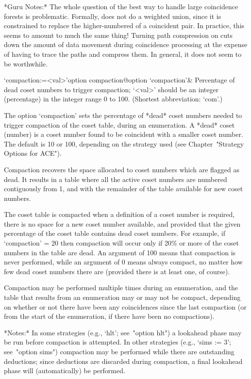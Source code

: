 *Guru Notes:*
The whole question of the best way to handle large coincidence forests
is problematic.  Formally, {\ACE} does  not do a weighted union, since
it is constrained to replace the higher-numbered of a coincident pair.
In practice,  this seems  to amount to  much the same  thing!  Turning
path  compression on  cuts down  the  amount of  data movement  during
coincidence processing at the expense of having to trace the paths and
compress them.  In general, it does not seem to be worthwhile.

\>`compaction:=<val>'{option compaction}@{option `compaction'}&
Percentage of dead coset numbers to trigger compaction; 
`<val>' should be an integer (percentage) in the integer  range  0  to
100. (Shortest abbreviation: `com'.)

The option `compaction' sets the percentage of  *dead*  coset  numbers
needed  to  trigger  compaction  of  the  coset   table,   during   an
enumeration. A *dead* coset (number) is a coset  number  found  to  be
coincident with a smaller coset number. The  default  is  10  or  100,
depending on the strategy  used  (see  Chapter~"Strategy  Options  for
ACE").

Compaction recovers the space allocated to  coset  numbers  which  are
flagged as dead. It results in a table  where  all  the  active  coset
numbers are numbered contiguously from 1, and with  the  remainder  of
the table available for new coset numbers.

The coset table is compacted when a definition of a  coset  number  is
required, there is no space for a  new  coset  number  available,  and
provided that the given percentage of the coset  table  contains  dead
coset numbers. For example, if `compaction'  =  $20$  then  compaction
will occur only if 20\% or more of the coset numbers in the table  are
dead. An argument of 100 means that  compaction  is  never  performed,
while an argument of 0 means always compact, no matter  how  few  dead
coset numbers there are (provided there is at least one, of course).

Compaction may be performed  multiple times during an enumeration, and
the table that results from an  enumeration may or may not be compact,
depending on whether or not there have been any coincidences since the
last compaction (or  from the start of the  enumeration, if there have
been no compactions).

*Notes:*
In some strategies (e.g., `hlt'; see~"option hlt") a  lookahead  phase
may be run before compaction is attempted. In other strategies  (e.g.,
`sims := 3'; see~"option sims")  compaction  may  be  performed  while
there are  outstanding  deductions;  since  deductions  are  discarded
during compaction, a final lookahead  phase  will  (automatically)  be
performed.

